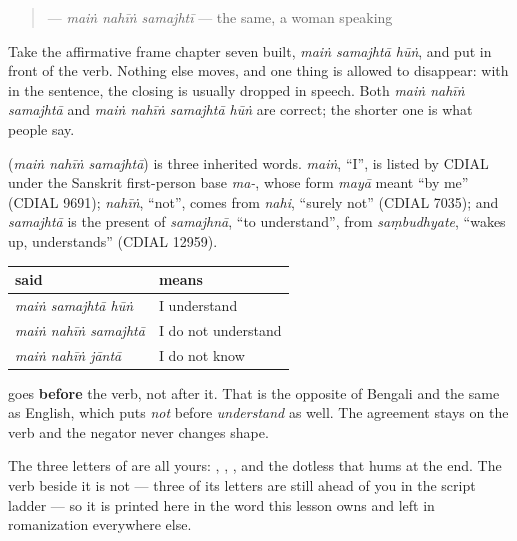 \begin{quote}
\textbf{  } — \emph{maiṅ nahīṅ samajhtī} — the same, a woman speaking
\end{quote}

Take the affirmative frame chapter seven built, \emph{maiṅ samajhtā hūṅ}, and put \textbf{} in front of the verb. Nothing else moves, and one thing is allowed to disappear: with \textbf{} in the sentence, the closing \textbf{} is usually dropped in speech. Both \emph{maiṅ nahīṅ samajhtā} and \emph{maiṅ nahīṅ samajhtā hūṅ} are correct; the shorter one is what people say.

\begin{cousinweb}
\textbf{  } (\emph{maiṅ nahīṅ samajhtā}) is three inherited words. \emph{maiṅ}, \textquotedblleft{}I\textquotedblright{}, is listed by CDIAL under the Sanskrit first-person base \emph{ma-}, whose form \emph{mayā} meant \textquotedblleft{}by me\textquotedblright{} (CDIAL 9691); \emph{nahīṅ}, \textquotedblleft{}not\textquotedblright{}, comes from \emph{nahi}, \textquotedblleft{}surely not\textquotedblright{} (CDIAL 7035); and \emph{samajhtā} is the present of \emph{samajhnā}, \textquotedblleft{}to understand\textquotedblright{}, from \emph{saṃbudhyate}, \textquotedblleft{}wakes up, understands\textquotedblright{} (CDIAL 12959).
\end{cousinweb}

\begin{grammarlens}[title={Grammar Lens: where the negator stands}]
\noindent
\begin{tabularx}{\linewidth}{@{}>{\raggedright\arraybackslash}X>{\raggedright\arraybackslash}X@{}}
\toprule
\textbf{said} & \textbf{means} \\
\midrule
\emph{maiṅ samajhtā hūṅ} & I understand \\
\emph{maiṅ nahīṅ samajhtā} & I do not understand \\
\emph{maiṅ nahīṅ jāntā} & I do not know \\
\bottomrule
\end{tabularx}

\textbf{} goes \textbf{before} the verb, not after it. That is the opposite of Bengali and the same as English, which puts \emph{not} before \emph{understand} as well. The agreement stays on the verb and the negator never changes shape.

The three letters of \textbf{} are all yours: \textbf{}, \textbf{}, \textbf{}, and the dotless \textbf{} that hums at the end. The verb beside it is not — three of its letters are still ahead of you in the script ladder — so it is printed here in the word this lesson owns and left in romanization everywhere else.
\end{grammarlens}

